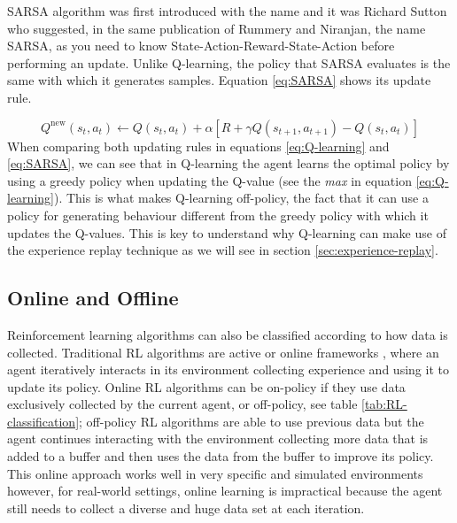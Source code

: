 SARSA algorithm was first introduced \cite{Rummery+Niranjan:1994} with the name  and it was Richard Sutton who suggested, in the same publication of Rummery and Niranjan, the name SARSA, as you need to know State-Action-Reward-State-Action before performing an update.  Unlike Q-learning, the policy that SARSA evaluates is the same with which it generates samples. Equation \ref{eq:SARSA} shows its update rule.

\begin{equation}
Q^{\text{new}}(s_t, a_t)  \leftarrow Q(s_t, a_t) + \alpha \left[R+ \gamma  Q(s_{t+1}, a_{t+1}) - Q(s_t, a_t)\right]
\label{eq:SARSA}
\end{equation}
When comparing both updating rules in equations \ref{eq:Q-learning} and \ref{eq:SARSA}, we can see that in Q-learning the agent learns the optimal policy by using a greedy policy when updating the Q-value (see the \textit{max} in equation \ref{eq:Q-learning}). This is what makes Q-learning off-policy, the fact that it can use a policy for generating behaviour different from the greedy policy with which it updates the Q-values. This is key to understand why Q-learning can make use of the experience replay technique as we will see in section \ref{sec:experience-replay}.



\subsection{Online and Offline} Reinforcement learning algorithms can also be classified according to how data is collected. Traditional RL algorithms are active or online frameworks \cite{youtube_offline_RL}, where an agent iteratively interacts in its environment collecting experience and using it to update its policy. Online RL algorithms can be on-policy if  they use data exclusively collected by the current agent, or off-policy, see table \ref{tab:RL-classification}; off-policy RL algorithms are able to use previous data but the agent continues interacting with the environment collecting more data that is added to a buffer and then uses the data from the buffer to improve its policy. This online approach works well in very specific and  simulated environments however, for real-world settings, online learning is impractical because the agent still needs to collect a diverse and huge data set at each iteration. 

